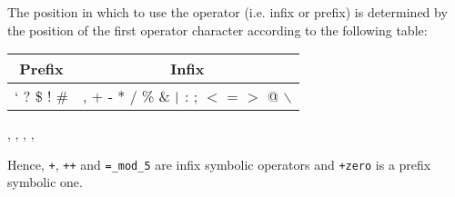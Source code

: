 The position in which to use the operator (i.e. infix or prefix)
is determined by the position of the first operator character
according to the following table:
\begin{center}
\begin{tabular}{|c|c|}
\hline
Prefix & Infix \\
\hline
` \tilde{} ? \$ ! \# &
, + - * / \% \& $\vertical$ : ; $<$ = $>$ @ \chapeau{} $\backslash$ \\
\hline
\end{tabular}
\end{center}

\begin{syn}
 \is
   \orelse \tok{\tilde} \orelse {} \orelse \tok{\$} \orelse
  \tok{!} \orelse \tok{\#}
\sep
{} \is
  \tok{,} \orelse \tok{+} \orelse \tok{-} \orelse \tok{*} \orelse
  \tok{/} \orelse \tok{\%} \orelse \tok{\&} \orelse \tok{\vertical} \orelse
  \tok{:} \orelse \tok{;} \orelse \tok{<} \orelse \tok{=} \orelse
  \tok{>} \orelse {} \orelse \tok{\chapeau} \orelse
  \tok{\backslash}
\sep
{} \is
   
\sep
{} \is
   
\sep
{} \is
   \orelse {}
\end{syn}


Hence, {\tt +}, {\tt ++} and {\tt =\_mod\_5} are infix symbolic operators and
{\tt \tilde+zero} is a prefix symbolic one.

